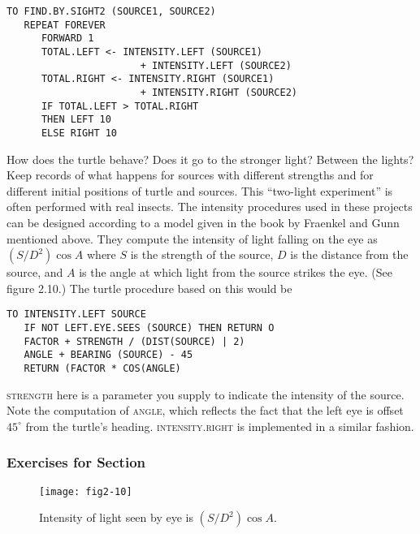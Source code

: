 \documentclass{book}
\begin{document}
\begin{verbatim}
TO FIND.BY.SIGHT2 (SOURCE1, SOURCE2)
   REPEAT FOREVER
      FORWARD 1
      TOTAL.LEFT <- INTENSITY.LEFT (SOURCE1)
                       + INTENSITY.LEFT (SOURCE2) 
      TOTAL.RIGHT <- INTENSITY.RIGHT (SOURCE1)
                       + INTENSITY.RIGHT (SOURCE2)
      IF TOTAL.LEFT > TOTAL.RIGHT
      THEN LEFT 10
      ELSE RIGHT 10
\end{verbatim}
How does the turtle behave? Does it go to the stronger light? Between
the lights? Keep records of what happens for sources with different
strengths and for different initial positions of turtle and sources. This
``two-light experiment'' is often performed with real insects.
The intensity procedures used in these projects can be designed according to a model given in the book by Fraenkel and Gunn mentioned above.
They compute the intensity of light falling on the eye as $(S/D^2)\cos A$
where $S$ is the strength of the source, $D$ is the distance from the source,
and $A$ is the angle at which light from the source strikes the eye. (See
figure 2.10.) The turtle procedure based on this would be

\begin{verbatim}
TO INTENSITY.LEFT SOURCE
   IF NOT LEFT.EYE.SEES (SOURCE) THEN RETURN O
   FACTOR + STRENGTH / (DIST(SOURCE) | 2)
   ANGLE + BEARING (SOURCE) - 45
   RETURN (FACTOR * COS(ANGLE) 
\end{verbatim}
\noindent \textsc{strength} here is a parameter you supply to indicate the intensity of
the source. Note the computation of \textsc{angle}, which reflects the fact that
the left eye is offset $45^{\circ}$ from the turtle's heading. \textsc{intensity.right} is
implemented in a similar fashion.

\subsubsection{Exercises for Section \thesection}

\begin{figure}
\begin{center}
\texttt{[image: fig2-10]}
\caption{Intensity of light seen by eye is $(S / D^2) \cos A$.}
\end{center}
\end{figure}
\end{document}
